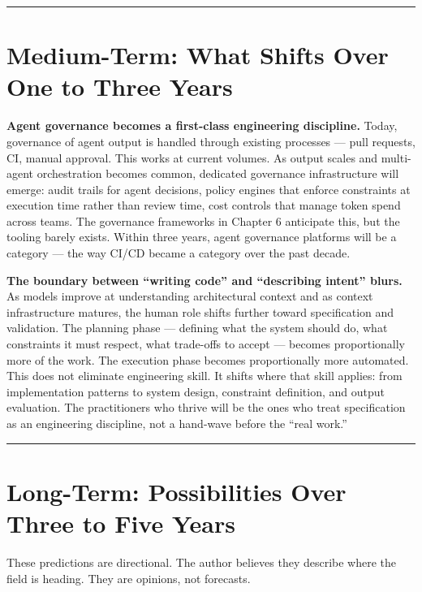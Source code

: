 \documentclass[
  a4paper,
  DIV=11,
  numbers=noendperiod]{scrreprt}
\begin{document}
\begin{center}\rule{0.5\linewidth}{0.5pt}\end{center}

\section{Medium-Term: What Shifts Over One to Three
Years}\label{medium-term-what-shifts-over-one-to-three-years}

\textbf{Agent governance becomes a first-class engineering discipline.}
Today, governance of agent output is handled through existing processes
--- pull requests, CI, manual approval. This works at current volumes.
As output scales and multi-agent orchestration becomes common, dedicated
governance infrastructure will emerge: audit trails for agent decisions,
policy engines that enforce constraints at execution time rather than
review time, cost controls that manage token spend across teams. The
governance frameworks in Chapter 6 anticipate this, but the tooling
barely exists. Within three years, agent governance platforms will be a
category --- the way CI/CD became a category over the past decade.

\textbf{The boundary between ``writing code'' and ``describing intent''
blurs.} As models improve at understanding architectural context and as
context infrastructure matures, the human role shifts further toward
specification and validation. The planning phase --- defining what the
system should do, what constraints it must respect, what trade-offs to
accept --- becomes proportionally more of the work. The execution phase
becomes proportionally more automated. This does not eliminate
engineering skill. It shifts where that skill applies: from
implementation patterns to system design, constraint definition, and
output evaluation. The practitioners who thrive will be the ones who
treat specification as an engineering discipline, not a hand-wave before
the ``real work.''

\begin{center}\rule{0.5\linewidth}{0.5pt}\end{center}

\section{Long-Term: Possibilities Over Three to Five
Years}\label{long-term-possibilities-over-three-to-five-years}

These predictions are directional. The author believes they describe
where the field is heading. They are opinions, not forecasts.
\end{document}
